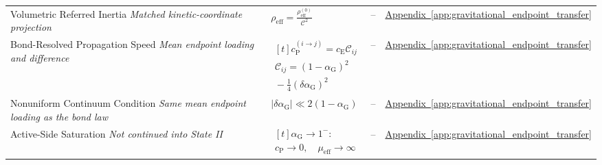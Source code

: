 \begin{longtable}{@{} p{4.5cm} p{6cm} c p{4cm} @{}}
{\raggedright Volumetric Referred Inertia \newline \textit{Matched kinetic-coordinate projection}\par} & {\raggedright $\rho_{\mathrm{eff}} = \frac{ \rho_{\mathrm{eff}}^{(0)} }{ \mathcal{C}^2 }$\par} & -- & {\raggedright \hyperref[app:gravitational_endpoint_transfer]{Appendix~\ref*{app:gravitational_endpoint_transfer}}\par} \\

{\raggedright Bond-Resolved Propagation Speed \newline \textit{Mean endpoint loading and difference}\par} & {\raggedright $\begin{gathered}[t]c_{\mathrm P}^{(i\to j)}=c_{\mathrm E}\mathcal C_{ij} \\ \mathcal C_{ij}=(1-\alpha_{\mathrm G})^2 \\ {}-\tfrac14(\delta\alpha_{\mathrm G})^2\end{gathered}$\par} & -- & {\raggedright \hyperref[app:gravitational_endpoint_transfer]{Appendix~\ref*{app:gravitational_endpoint_transfer}}\par} \\

{\raggedright Nonuniform Continuum Condition \newline \textit{Same mean endpoint loading as the bond law}\par} & {\raggedright $|\delta\alpha_{\mathrm G}|\ll2(1-\alpha_{\mathrm G})$\par} & -- & {\raggedright \hyperref[app:gravitational_endpoint_transfer]{Appendix~\ref*{app:gravitational_endpoint_transfer}}\par} \\

{\raggedright Active-Side Saturation \newline \textit{Not continued into State II}\par} & {\raggedright $\begin{gathered}[t]\alpha_{\mathrm G}\to1^-: \\ c_{\mathrm P}\to0,\quad\mu_{\mathrm{eff}}\to\infty\end{gathered}$\par} & -- & {\raggedright \hyperref[app:gravitational_endpoint_transfer]{Appendix~\ref*{app:gravitational_endpoint_transfer}}\par} \\

\bottomrule
\end{longtable}

